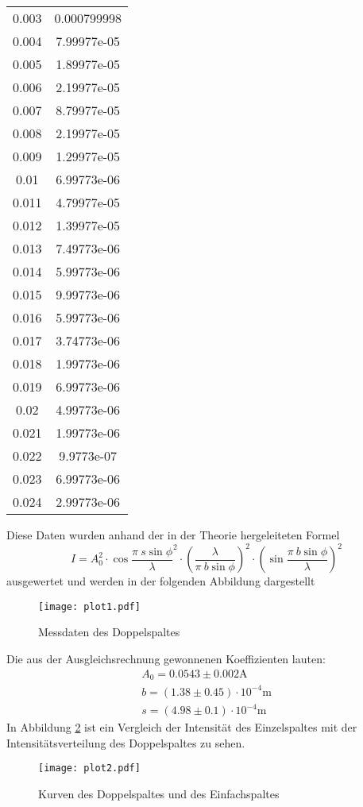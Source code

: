 \begin{table}[H]
\begin{tabular}{c c}
  0.003       & 0.000799998 \\
  0.004       & 7.99977e-05 \\
  0.005       & 1.89977e-05 \\
  0.006       & 2.19977e-05 \\
  0.007       & 8.79977e-05 \\
  0.008       & 2.19977e-05 \\
  0.009       & 1.29977e-05 \\
  0.01        & 6.99773e-06 \\
  0.011       & 4.79977e-05 \\
  0.012       & 1.39977e-05 \\
  0.013       & 7.49773e-06 \\
  0.014       & 5.99773e-06 \\
  0.015       & 9.99773e-06 \\
  0.016       & 5.99773e-06 \\
  0.017       & 3.74773e-06 \\
  0.018       & 1.99773e-06 \\
  0.019       & 6.99773e-06 \\
  0.02        & 4.99773e-06 \\
  0.021       & 1.99773e-06 \\
  0.022       & 9.9773e-07  \\
  0.023       & 6.99773e-06 \\
  0.024       & 2.99773e-06 \\
  \bottomrule
  \end{tabular}
  \end{table}
  Diese Daten wurden anhand der in der Theorie hergeleiteten Formel 
  \begin{equation*}
    I= A_0^2\cdot \cos{\dfrac{\pi\ s \sin{\phi}}{\lambda}}^2 \cdot
    (\dfrac{\lambda}{\pi \ b \sin{\phi}})^2 \cdot (\sin{\dfrac{\pi\ b \sin{\phi}}{\lambda}})^2
  \end{equation*}
  ausgewertet und werden in der folgenden Abbildung dargestellt
  \begin{figure}
    \centering
    \texttt{[image: plot1.pdf]}
    \caption{Messdaten des Doppelspaltes}
    \label{fig:p}
  \end{figure}
  Die aus der Ausgleichsrechnung gewonnenen Koeffizienten lauten:
  \begin{align*}
    A_0 = 0.0543 \pm 0.002 \si{\ampere}\\
    b = (1.38 \pm 0.45)\cdot 10^{-4} \si{\metre}\\
    s = (4.98 \pm 0.1) \cdot 10^{-4} \si{\metre}
  \end{align*}
  In Abbildung \ref{fig:verleich} ist ein Vergleich der Intensität des Einzelspaltes mit der 
  Intensitätsverteilung des Doppelspaltes zu sehen.
  \begin{figure}
    \centering
    \texttt{[image: plot2.pdf]}
    \caption{Kurven des Doppelspaltes und des Einfachspaltes}
    \label{fig:verleich}
  \end{figure}